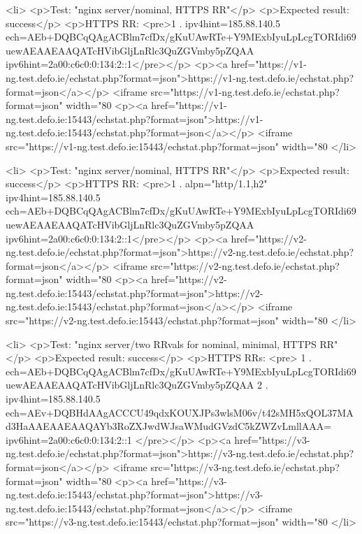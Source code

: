<li>
<p>Test: "nginx server/nominal, HTTPS RR"</p>
<p>Expected result: success</p>
<p>HTTPS RR: <pre>1 . ipv4hint=185.88.140.5 ech=AEb+DQBCqQAgACBlm7cfDx/gKuUAwRTe+Y9MExbIyuLpLcgTORIdi69uewAEAAEAAQATcHVibGljLnRlc3QuZGVmby5pZQAA ipv6hint=2a00:c6c0:0:134:2::1</pre></p>
<p><a href="https://v1-ng.test.defo.ie/echstat.php?format=json">https://v1-ng.test.defo.ie/echstat.php?format=json</a></p>
<iframe src="https://v1-ng.test.defo.ie/echstat.php?format=json" width="80%
<p><a href="https://v1-ng.test.defo.ie:15443/echstat.php?format=json">https://v1-ng.test.defo.ie:15443/echstat.php?format=json</a></p>
<iframe src="https://v1-ng.test.defo.ie:15443/echstat.php?format=json" width="80%
</li>

<li>
<p>Test: "nginx server/nominal, HTTPS RR"</p>
<p>Expected result: success</p>
<p>HTTPS RR: <pre>1 . alpn="http/1.1,h2" ipv4hint=185.88.140.5 ech=AEb+DQBCqQAgACBlm7cfDx/gKuUAwRTe+Y9MExbIyuLpLcgTORIdi69uewAEAAEAAQATcHVibGljLnRlc3QuZGVmby5pZQAA ipv6hint=2a00:c6c0:0:134:2::1</pre></p>
<p><a href="https://v2-ng.test.defo.ie/echstat.php?format=json">https://v2-ng.test.defo.ie/echstat.php?format=json</a></p>
<iframe src="https://v2-ng.test.defo.ie/echstat.php?format=json" width="80%
<p><a href="https://v2-ng.test.defo.ie:15443/echstat.php?format=json">https://v2-ng.test.defo.ie:15443/echstat.php?format=json</a></p>
<iframe src="https://v2-ng.test.defo.ie:15443/echstat.php?format=json" width="80%
</li>

<li>
<p>Test: "nginx server/two RRvals for nominal, minimal, HTTPS RR"</p>
<p>Expected result: success</p>
<p>HTTPS RRs: <pre>
1 . ech=AEb+DQBCqQAgACBlm7cfDx/gKuUAwRTe+Y9MExbIyuLpLcgTORIdi69uewAEAAEAAQATcHVibGljLnRlc3QuZGVmby5pZQAA
2 . ipv4hint=185.88.140.5 ech=AEv+DQBHdAAgACCCU49qdxKOUXJPs3wlsM06v/t42sMH5xQOL37MAd3HaAAEAAEAAQAYb3RoZXJwdWJsaWMudGVzdC5kZWZvLmllAAA= ipv6hint=2a00:c6c0:0:134:2::1
</pre></p>
<p><a href="https://v3-ng.test.defo.ie/echstat.php?format=json">https://v3-ng.test.defo.ie/echstat.php?format=json</a></p>
<iframe src="https://v3-ng.test.defo.ie/echstat.php?format=json" width="80%
<p><a href="https://v3-ng.test.defo.ie:15443/echstat.php?format=json">https://v3-ng.test.defo.ie:15443/echstat.php?format=json</a></p>
<iframe src="https://v3-ng.test.defo.ie:15443/echstat.php?format=json" width="80%
</li>


